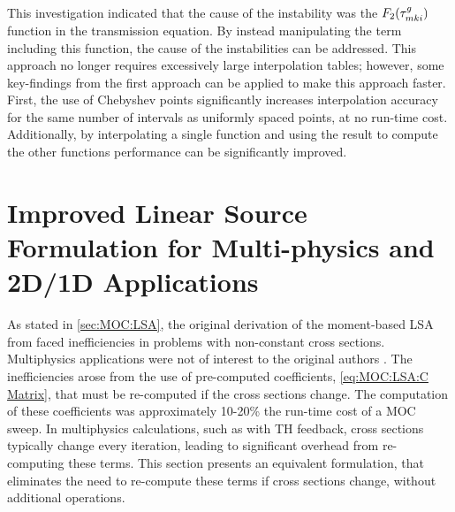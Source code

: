 {{{      This investigation indicated that the cause of the instability was the $F_2(\segopt)$ function in the transmission equation.
      By instead manipulating the term including this function, the cause of the instabilities can be addressed.
      This approach no longer requires excessively large interpolation tables; however, some key-findings from the first approach can be applied to make this approach faster.
      First, the use of Chebyshev points significantly increases interpolation accuracy for the same number of intervals as uniformly spaced points, at no run-time cost.
      Additionally, by interpolating a single function and using the result to compute the other functions performance can be significantly improved.
    }
  }
  \section{Improved Linear Source Formulation for Multi-physics and 2D/1D Applications}{\label{sec:Improved Linear Source Formulation for Multi-physics and 2D/1D Applications}
    As stated in \cref{sec:MOC:LSA}, the original derivation of the moment-based \acf{LSA} from \citet{Ferrer2016} faced inefficiencies in problems with non-constant cross sections.
    Multiphysics applications were not of interest to the original authors \cite{Ferrer2016}.
    The inefficiencies arose from the use of pre-computed coefficients, \cref{eq:MOC:LSA:C Matrix}, that must be re-computed if the cross sections change.
    The computation of these coefficients was approximately 10-20\% the run-time cost of a \ac{MOC} sweep.
    In multiphysics calculations, such as with \ac{TH} feedback, cross sections typically change every iteration, leading to significant overhead from re-computing these terms.
    This section presents an equivalent formulation, that eliminates the need to re-compute these terms if cross sections change, without additional operations.

}}
